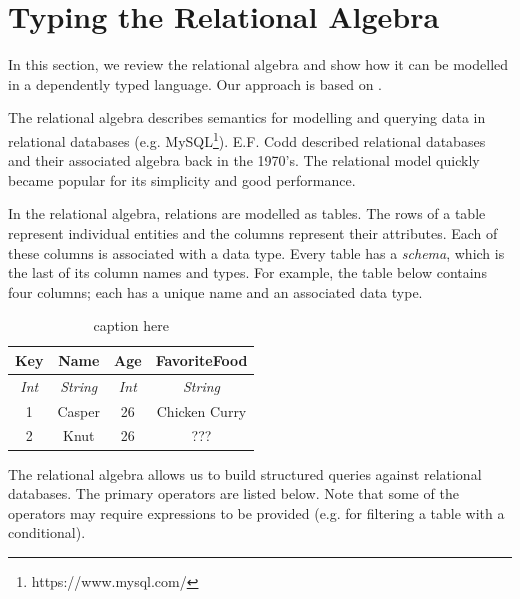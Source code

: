 \documentclass[12pt]{article}
\begin{document}
\section{Typing the Relational Algebra}\label{sec:typing_the_relational_algebra}

In this section, we review the relational algebra and show how it can be modelled in a dependently typed language.
Our approach is based on \cite{OurySwierstra08PowerOfPi}.

The relational algebra describes semantics for modelling and querying data in relational databases (e.g. MySQL\footnote{https://www.mysql.com/}).
E.F. Codd described relational databases and their associated algebra back in the 1970's.
The relational model quickly became popular for its simplicity and good performance.

In the relational algebra, relations are modelled as tables.
The rows of a table represent individual entities and the columns represent their attributes.
Each of these columns is associated with a data type.
Every table has a \textit{schema}, which is the last of its column names and types.
For example, the table below contains four columns; each has a unique name and an associated data type.

\begin{table}[tb]
    \caption{caption here}
    \label{tab:tablename}
    \centering

    \begin{tabular}{|c|c|c|c|}
    \hline

    \hline
    \textbf{Key} & \textbf{Name} & \textbf{Age} & \textbf{FavoriteFood} \\
    \hline
    \textit{Int} & \textit{String} & \textit{Int} & \textit{String} \\
    \hline
    \hline
       1 & Casper & 26 & Chicken Curry \\
       2 & Knut & 26 & ??? \\
    \hline

    \end{tabular}
\end{table}

The relational algebra allows us to build structured queries against relational databases.
The primary operators are listed below.
Note that some of the operators may require expressions to be provided (e.g. for filtering a table with a conditional).
\end{document}

